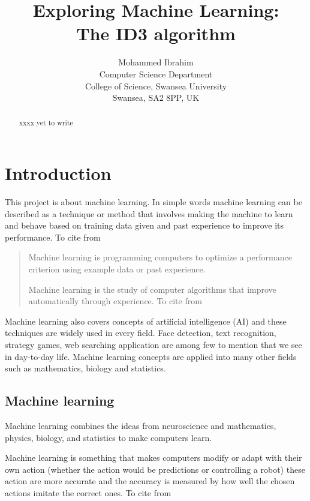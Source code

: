 \documentclass{article}
\begin{document}
\title{Exploring Machine Learning:\\
  The ID3 algorithm}

\author{Mohammed Ibrahim\\
 Computer Science Department\\
  College of Science, Swansea University\\
  Swansea, SA2 8PP, UK
}

\maketitle
\begin{abstract}
xxxx yet to write
\end{abstract}
\pagebreak
\tableofcontents
\pagebreak
\section{Introduction}
\label{sec:int}

This project is about machine learning. In simple words machine learning can be described as a technique or method that involves making the machine to learn and behave based on training data given and past experience to improve its performance. To cite from \cite{Alpaydin2010MachineLearning} 
\begin{quote}
  Machine learning is programming computers to optimize a performance
  criterion using example data or past experience.


Machine learning is the study of computer algorithms that improve automatically through experience. To cite from \cite{Mitchell1997MachineLearning}
\end{quote}
Machine learning also covers concepts of artificial intelligence (AI) and these techniques are widely used in every field. Face detection, text recognition, strategy games, web searching application are among few to mention that we see in day-to-day life. Machine learning concepts are applied into many other fields such as mathematics, biology and statistics.



\subsection{Machine learning}
\label{sec:machinelearn}

Machine learning combines the ideas from neuroscience and mathematics, physics, biology, and statistics to make computers learn.

Machine learning is something that makes computers modify or adapt with their own action (whether the action would be predictions or controlling a robot) these action are more accurate and the accuracy is measured by how well the chosen actions imitate the correct ones. To cite from \cite{MachineLearningAnAlgorithmicPerspective}
\end{document}
